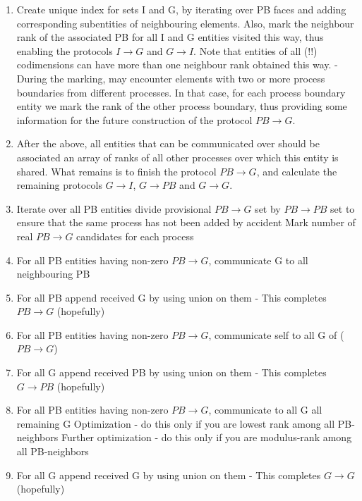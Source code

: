 \begin{enumerate}
	\item Create unique index for sets I and G, by iterating over PB faces and adding corresponding subentities of neighbouring elements. Also, mark the neighbour rank of the associated PB for all I and G entities visited this way, thus enabling the protocols $I \rightarrow G$ and $G \rightarrow I$. Note that entities of all (!!) codimensions can have more than one neighbour rank obtained this way.
		\subitem - During the marking, may encounter elements with two or more process boundaries from different processes. In that case, for each process boundary entity we mark the rank of the other process boundary, thus providing some information for the future construction of the protocol $PB \rightarrow G$.
	\item After the above, all entities that can be communicated over should be associated an array of ranks of all other processes over which this entity is shared. What remains is to finish the protocol $PB \rightarrow G$, and calculate the remaining protocols $G \rightarrow I$, $G \rightarrow PB$ and $G \rightarrow G$.
	\item Iterate over all PB entities
		\subitem divide provisional $PB \rightarrow G$ set by $PB\rightarrow PB$ set to ensure that the same process has not been added by accident
		\subitem Mark number of real $PB \rightarrow G$ candidates for each process
	\item For all PB entities having non-zero $PB \rightarrow G$, communicate G to all neighbouring PB
	\item For all PB append received G by using union on them - This completes $PB \rightarrow G$ (hopefully)
	\item For all PB entities having non-zero $PB \rightarrow G$, communicate self to all G of ($PB \rightarrow G$)
	\item For all G append received PB by using union on them - This completes $G \rightarrow PB$  (hopefully)
	\item For all PB entities having non-zero $PB \rightarrow G$, communicate to all G all remaining G
		\subitem Optimization - do this only if you are lowest rank among all PB-neighbors
		\subitem Further optimization - do this only if you are modulus-rank among all PB-neighbors
	\item For all G append received G by using union on them - This completes $G \rightarrow G$ (hopefully)	
\end{enumerate}
    







